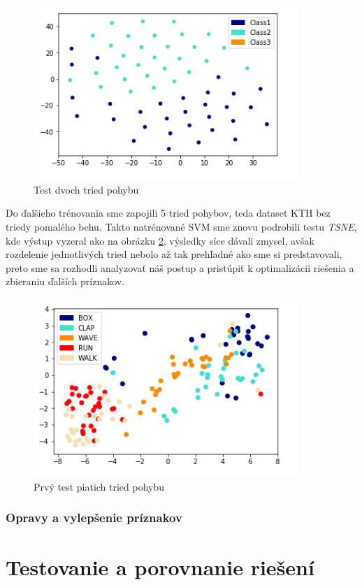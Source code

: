 \begin{figure}[h]
  \centering
  \includegraphics[width=10cm]{img/test2classes.png}
  \caption{Test dvoch tried pohybu}
  \label{Test2Class}
\end{figure} 


Do ďalšieho trénovania sme zapojili 5 tried pohybov, teda dataset KTH bez triedy pomalého behu. Takto natrénované SVM sme znovu podrobili testu \textit{TSNE}, kde výstup vyzeral ako na obrázku \ref{Test5Class1}, výsledky síce dávali zmysel, avšak rozdelenie jednotlivých tried nebolo až tak prehľadné ako sme si predstavovali, preto sme sa rozhodli analyzovať náš postup a pristúpiť k optimalizácii riešenia a zbieraniu ďalších príznakov. 

\begin{figure}[h]
  \centering
  \includegraphics[width=10cm]{img/test5classes1.png}
  \caption{Prvý test piatich tried pohybu}
  \label{Test5Class1}
\end{figure}

\subsubsection{Opravy a vylepšenie príznakov}
\section{Testovanie a porovnanie riešení}





